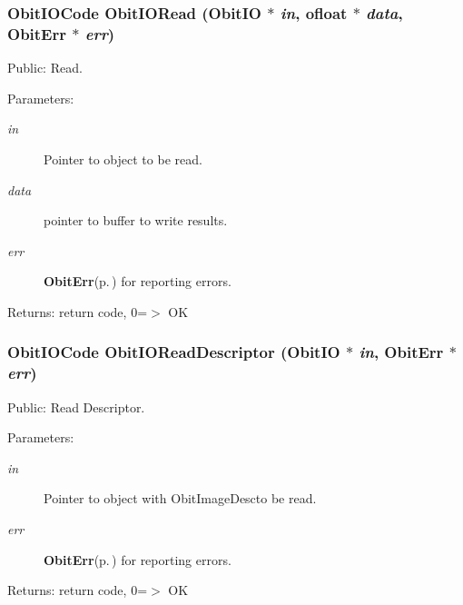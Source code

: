 \subsubsection{\setlength{\rightskip}{0pt plus 5cm}Obit\-IOCode Obit\-IORead ({\bf Obit\-IO} $\ast$ {\em in}, {\bf ofloat} $\ast$ {\em data}, {\bf Obit\-Err} $\ast$ {\em err})}\label{ObitIO_8c_a15}


Public: Read. 

\begin{Desc}
\item[Parameters:]
\begin{description}
\item[{\em in}]Pointer to object to be read. \item[{\em data}]pointer to buffer to write results. \item[{\em err}]{\bf Obit\-Err}{\rm (p.\,\pageref{structObitErr})} for reporting errors. \end{description}
\end{Desc}
\begin{Desc}
\item[Returns:]return code, 0=$>$ OK \end{Desc}
\subsubsection{\setlength{\rightskip}{0pt plus 5cm}Obit\-IOCode Obit\-IORead\-Descriptor ({\bf Obit\-IO} $\ast$ {\em in}, {\bf Obit\-Err} $\ast$ {\em err})}\label{ObitIO_8c_a25}


Public: Read Descriptor. 

\begin{Desc}
\item[Parameters:]
\begin{description}
\item[{\em in}]Pointer to object with Obit\-Image\-Descto be read. \item[{\em err}]{\bf Obit\-Err}{\rm (p.\,\pageref{structObitErr})} for reporting errors. \end{description}
\end{Desc}
\begin{Desc}
\item[Returns:]return code, 0=$>$ OK \end{Desc}

